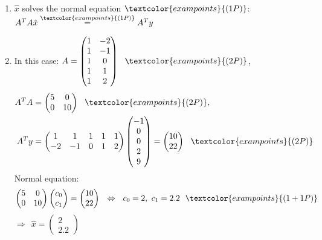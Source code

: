 {\color{solution}
\begin{enumerate}
	\item $\hat{x}$ solves the normal equation $\textcolor{exampoints}{(1P)}$: $A^TA\hat{x}\stackrel{\textcolor{exampoints}{(1P)}}{=}A^Ty$
	\item In this case: $A=\begin{pmatrix}1&-2\\1&-1\\1&0\\1&1\\1&2\end{pmatrix}~~\textcolor{exampoints}{(2P)}$,
	\begin{align*}
	A^TA&=\begin{pmatrix}5&0\\0&10\end{pmatrix}~~\textcolor{exampoints}{(2P)},\\
	A^Ty&=\begin{pmatrix}1&1&1&1&1\\-2&-1&0&1&2\end{pmatrix}
	\begin{pmatrix}-1\\0\\0\\2\\9\end{pmatrix}
	=\begin{pmatrix}10\\22\end{pmatrix}~~\textcolor{exampoints}{(2P)}
	\end{align*}
	Normal equation: 
	$$\begin{pmatrix}5&0\\0&10\end{pmatrix}\begin{pmatrix}c_0\\c_1\end{pmatrix}
	=\begin{pmatrix}10\\22\end{pmatrix}~~\Leftrightarrow~~c_0=2,~c_1=2.2~~\textcolor{exampoints}{(1+1P)}$$
	$\Rightarrow~~\hat{x}=\begin{pmatrix}2\\2.2\end{pmatrix}$
\end{enumerate}
}